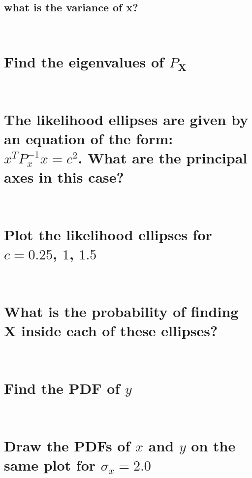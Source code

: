\documentclass[12pt,letterpaper, onecolumn]{exam}
\begin{document}
\begin{questions}
\begin{parts}
            \part{what is the variance of x?}\\
                \solution
        \end{parts}        
\clearpage    
        \begin{parts}
            \part{Find the eigenvalues of $P_{\mathbf{X}}$}\\
                \solution
            \part{The likelihood ellipses are given by an equation of the form: $x^T P^{-1}_x x = c^2$. What are the principal axes in this case?}\\
                \solution
            \part{Plot the likelihood ellipses for $c = 0.25$, $1$, $1.5$}\\
                \solution
            \part{What is the probability of finding $\mathbf{X}$ inside each of these ellipses?}\\
                \solution    
        \end{parts}
\clearpage        
        \begin{parts}
            \part{Find the PDF of $y$}\\
                \solution
            \part{Draw the PDFs of $x$ and $y$ on the same plot for $\sigma_x = 2.0$}\\
                \solution

\end{parts}
\end{questions}
\end{document}
